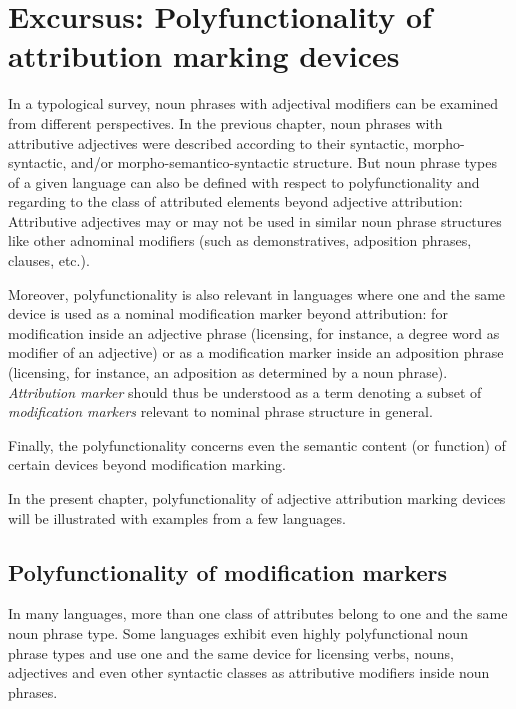 
\chapter[Polyfunctionality]{Excursus: Polyfunctionality of attribution marking devices} \label{polyfunctionality}
In a typological survey, noun phrases with adjectival modifiers can be examined from different perspectives. In the previous chapter, noun phrases with attributive adjectives were described according to their syntactic, morpho-syntactic, and/or morpho-semantico-syntactic structure. But noun phrase types of a given language can also be defined with respect to polyfunctionality and regarding to the class of attributed elements beyond adjective attribution: Attributive adjectives may or may not be used in similar noun phrase structures like other adnominal modifiers (such as demonstratives, adposition phrases, clauses, etc.).

Moreover, polyfunctionality is also relevant in languages where one and the same device is used as a nominal modification marker beyond attribution: for modification inside an adjective phrase (licensing, for instance, a degree word as modifier of an adjective) or as a modification marker inside an adposition phrase (licensing, for instance, an adposition as determined by a noun phrase). \textit{Attribution marker} should thus be understood as a term denoting a subset of \textit{modification markers} relevant to nominal phrase structure in general.

Finally, the polyfunctionality concerns even the semantic content (or function) of certain devices beyond modification marking. 

In the present chapter, polyfunctionality of adjective attribution marking devices will be illustrated with examples from a few languages.

\section{Polyfunctionality of modification markers}
In many languages, more than one class of attributes belong to one and the same noun phrase type. Some languages exhibit even highly polyfunctional noun phrase types and use one and the same device for licensing verbs, nouns, adjectives and even other syntactic classes as attributive modifiers inside noun phrases.


